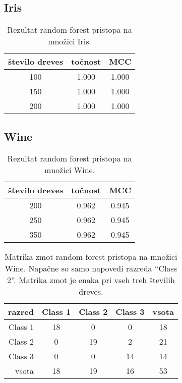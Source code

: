 \subsection{Iris}\label{subsec:random-forest-iris-test}
\begin{table}[H]
    \begin{center}
        \begin{tabular}{|| c | c c ||}
            \hline
            število dreves & točnost & MCC   \\
            \hline
            100            & 1.000   & 1.000 \\
            \hline
            150            & 1.000   & 1.000 \\
            \hline
            200            & 1.000   & 1.000 \\
            \hline
        \end{tabular}
    \end{center}
    \caption{Rezultat random forest pristopa na množici Iris.}
    \label{tab:rforest_iris_result}
\end{table}

\subsection{Wine}\label{subsec:random-forest-wine-test}
\begin{table}[H]
    \begin{center}
        \begin{tabular}{|| c | c c ||}
            \hline
            število dreves & točnost & MCC   \\
            \hline
            200            & 0.962   & 0.945 \\
            \hline
            250            & 0.962   & 0.945 \\
            \hline
            350            & 0.962   & 0.945 \\
            \hline
        \end{tabular}
    \end{center}
    \caption{Rezultat random forest pristopa na množici Wine.}
    \label{tab:rforest_wine_result}
\end{table}

\begin{table}[H]
    \centering
    \begin{tabular}{||rcccc||}
        \hline
        razred  & Class 1 & Class 2 & Class 3 & vsota \\ \hline
        Class 1 & 18      & 0       & 0       & 18    \\ \hline
        Class 2 & 0       & 19      & 2       & 21    \\ \hline
        Class 3 & 0       & 0       & 14      & 14    \\ \hline
        vsota   & 18      & 19      & 16      & 53    \\ \hline
    \end{tabular}
    \caption{Matrika zmot random forest pristopa na množici Wine. Napačne so samo napovedi razreda \enquote{Class 2}.
    Matrika zmot je enaka pri vseh treh številih dreves.}
    \label{tab:rforest_wine_cm}
\end{table}

